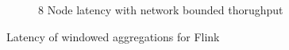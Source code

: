 \begin{figure}
\begin{subfigure}[b]{0.23\textwidth}
        \caption{8 Node latency with network bounded thorughput }
    \end{subfigure}




        \caption{Latency of windowed aggregations for Flink}
\end{figure}